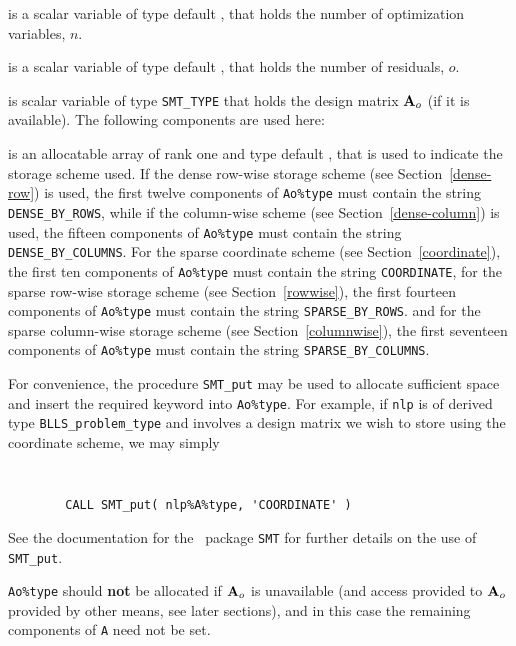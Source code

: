 \documentclass{galahad}
\newcommand{\packagename}{BLLS}
\begin{document}
\begin{description}

 is a scalar variable of type default \integer,
 that holds the number of optimization variables, $n$.

 is a scalar variable of type default \integer,
 that holds the number of residuals, $o$.

 is scalar variable of type {\tt SMT\_TYPE}
that holds the design matrix ${\mathbf{A}}_o$ (if it is available).
The following components are used here:

\begin{description}

 is an allocatable array of rank one and type default
\character, that
is used to indicate the storage scheme used. If the dense row-wise
storage scheme (see Section~\ref{dense-row}) is used,
the first twelve components of {\tt Ao\%type} must contain the
string {\tt DENSE\_BY\_ROWS}, while if the column-wise scheme
(see Section~\ref{dense-column}) is used,
the fifteen components of {\tt Ao\%type} must contain the
string {\tt DENSE\_BY\_COLUMNS}.
For the sparse coordinate scheme (see Section~\ref{coordinate}),
the first ten components of {\tt Ao\%type} must contain the
string {\tt COORDINATE},
for the sparse row-wise storage scheme (see Section~\ref{rowwise}),
the first fourteen components of {\tt Ao\%type} must contain the
string {\tt SPARSE\_BY\_ROWS}.
and for the sparse column-wise storage scheme (see Section~\ref{columnwise}),
the first seventeen components of {\tt Ao\%type} must contain the
string {\tt SPARSE\_BY\_COLUMNS}.

For convenience, the procedure {\tt SMT\_put}
may be used to allocate sufficient space and insert the required keyword
into {\tt Ao\%type}.
For example, if {\tt nlp} is of derived type {\tt \packagename\_problem\_type}
and involves a design matrix we wish to store using the coordinate scheme,
we may simply
{\tt
\begin{verbatim}
        CALL SMT_put( nlp%A%type, 'COORDINATE' )
\end{verbatim}
}
\noindent
See the documentation for the \galahad\ package {\tt SMT}
for further details on the use of {\tt SMT\_put}.

\noindent
{\tt Ao\%type} should {\bf not} be allocated if ${\mathbf{A}}_o$ is unavailable
(and access provided to  ${\mathbf{A}}_o$ provided by other means, see later sections), 
and in this case the remaining components of {\tt A} need not be set.


\end{description}
\end{description}
\end{document}

